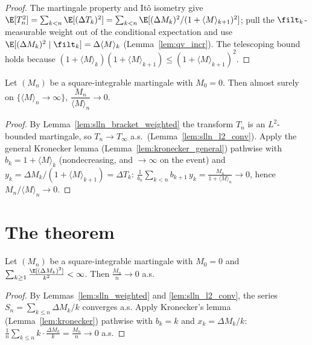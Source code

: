 \begin{proof}\leanok
{}
The martingale property and Itô isometry give
$\E[T_n^2]=\sum_{k<n}\E[(\Delta T_k)^2]=\sum_{k<n}\E[(\Delta M_k)^2/(1+\langle M\rangle_{k+1})^2]$;
pull the $\filt_k$-measurable weight out of the conditional expectation and use
$\E[(\Delta M_k)^2\mid\filt_k]=\Delta\langle M\rangle_k$ (Lemma~\ref{lem:qv_incr}). The telescoping
bound holds because $(1+\langle M\rangle_k)(1+\langle M\rangle_{k+1})\le(1+\langle M\rangle_{k+1})^2$.
\end{proof}

\begin{theorem}\label{thm:mart_slln_bracket}
\leanok
{}
Let $(M_n)$ be a square-integrable martingale with $M_0=0$. Then almost surely on
$\{\langle M\rangle_n\to\infty\}$, $\dfrac{M_n}{\langle M\rangle_n}\to0$.
\end{theorem}

\begin{proof}\leanok
{}
By Lemma~\ref{lem:slln_bracket_weighted} the transform $T_n$ is an $L^2$-bounded martingale, so
$T_n\to T_\infty$ a.s.\ (Lemma~\ref{lem:slln_l2_conv}). Apply the general Kronecker lemma
(Lemma~\ref{lem:kronecker_general}) pathwise with $b_k=1+\langle M\rangle_k$ (nondecreasing, and
$\to\infty$ on the event) and $y_k=\Delta M_k/(1+\langle M\rangle_{k+1})=\Delta T_k$:
$\frac1{b_n}\sum_{k<n} b_{k+1}\,y_k=\frac{M_n}{1+\langle M\rangle_n}\to0$, hence
$M_n/\langle M\rangle_n\to0$.
\end{proof}

\section{The theorem}
\label{sec:pre_slln_thm}

\begin{theorem}\label{thm:mart_slln}
\leanok
{}
Let $(M_n)$ be a square-integrable martingale with $M_0 = 0$ and
$\sum_{k\ge1}\frac{\E[(\Delta M_k)^2]}{k^2} < \infty$. Then $\frac{M_n}{n}\to 0$
a.s.
\end{theorem}

\begin{proof}\leanok
By Lemmas~\ref{lem:slln_weighted} and \ref{lem:slln_l2_conv}, the series
$S_n = \sum_{k\le n}\Delta M_k/k$ converges a.s. Apply Kronecker's lemma
(Lemma~\ref{lem:kronecker}) pathwise with $b_k = k$ and $x_k = \Delta M_k/k$:
$\frac{1}{n}\sum_{k\le n} k\cdot\frac{\Delta M_k}{k} = \frac{M_n}{n}\to 0$ a.s.
\end{proof}

